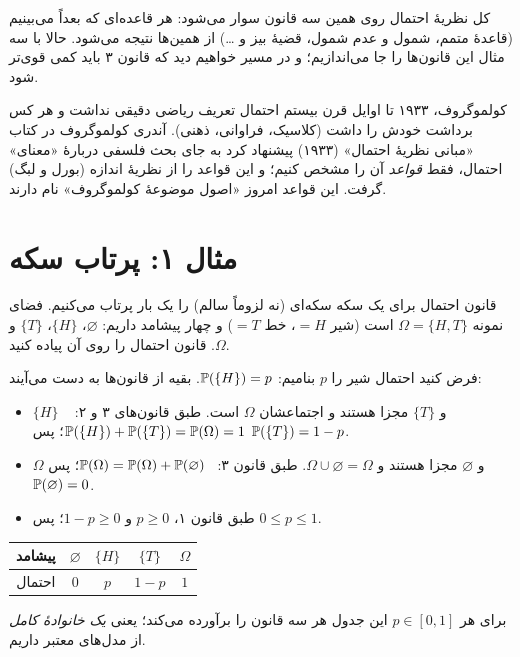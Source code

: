کل نظریهٔ احتمال روی همین سه قانون سوار می‌شود: هر قاعده‌ای که بعداً می‌بینیم (قاعدهٔ متمم، شمول و عدم شمول، قضیهٔ بیز و \dots) از همین‌ها نتیجه می‌شود. حالا با سه مثال این قانون‌ها را جا می‌اندازیم؛ و در مسیر خواهیم دید که قانون ۳ باید کمی قوی‌تر شود.

\begin{history}{کولموگروف، ۱۹۳۳}
تا اوایل قرن بیستم احتمال تعریف ریاضی دقیقی نداشت و هر کس برداشت خودش را داشت (کلاسیک، فراوانی، ذهنی). آندری کولموگروف در کتاب «مبانی نظریهٔ احتمال» (۱۹۳۳) پیشنهاد کرد به جای بحث فلسفی دربارهٔ «معنای» احتمال، فقط \emph{قواعد} آن را مشخص کنیم؛ و این قواعد را از نظریهٔ اندازه (بورل و لبگ) گرفت. این قواعد امروز «اصول موضوعهٔ کولموگروف» نام دارند.
\end{history}

\section{مثال ۱: پرتاب سکه}

\begin{example}[label=ex:coin-law]{قانون احتمال برای یک سکه}
سکه‌ای (نه لزوماً سالم) را یک بار پرتاب می‌کنیم. فضای نمونه $\Omega=\{H,T\}$ است (شیر $=H$، خط $=T$) و چهار پیشامد داریم: $\varnothing$، $\{H\}$، $\{T\}$ و $\Omega$. قانون احتمال را روی آن پیاده کنید.
\begin{solution}
فرض کنید احتمال شیر را $p$ بنامیم: $\P(\{H\})=p$. بقیه از قانون‌ها به دست می‌آیند:
\begin{itemize}
  \item $\{H\}$ و $\{T\}$ مجزا هستند و اجتماعشان $\Omega$ است. طبق قانون‌های ۳ و ۲: \ $\P(\{H\})+\P(\{T\})=\P(\Omega)=1$؛ پس $\P(\{T\})=1-p$.
  \item $\Omega$ و $\varnothing$ مجزا هستند و $\Omega\cup\varnothing=\Omega$. طبق قانون ۳: \ $\P(\Omega)=\P(\Omega)+\P(\varnothing)$؛ پس $\P(\varnothing)=0$.
  \item طبق قانون ۱، $p\ge0$ و $1-p\ge0$؛ پس $0\le p\le1$.
\end{itemize}
\begin{center}
\renewcommand{\arraystretch}{1.3}
\begin{tabular}{c|cccc}
پیشامد & $\varnothing$ & $\{H\}$ & $\{T\}$ & $\Omega$\\\hline
احتمال & $0$ & $p$ & $1-p$ & $1$
\end{tabular}
\end{center}
برای هر $p\in[0,1]$ این جدول هر سه قانون را برآورده می‌کند؛ یعنی \emph{یک خانوادهٔ کامل} از مدل‌های معتبر داریم.
\end{solution}
\end{example}

